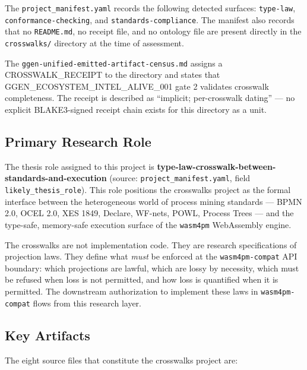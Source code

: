 The \texttt{project\_manifest.yaml} records the following detected surfaces: \texttt{type-law},
\texttt{conformance-checking}, and \texttt{standards-compliance}. The manifest also records that
no \texttt{README.md}, no receipt file, and no ontology file are present directly in the
\texttt{crosswalks/} directory at the time of assessment.

The \texttt{ggen-unified-emitted-artifact-census.md} assigns a \textsc{CROSSWALK\_RECEIPT} to
the directory and states that \textsc{GGEN\_ECOSYSTEM\_INTEL\_ALIVE\_001} gate 2 validates
crosswalk completeness. The receipt is described as ``implicit; per-crosswalk dating'' --- no
explicit \textsc{BLAKE3}-signed receipt chain exists for this directory as a unit.

\subsection{Primary Research Role}
\label{sec:crosswalks-identity-role}

The thesis role assigned to this project is \textbf{type-law-crosswalk-between-standards-and-execution}
(source: \texttt{project\_manifest.yaml}, field \texttt{likely\_thesis\_role}). This role
positions the crosswalks project as the formal interface between the heterogeneous world of
process mining standards --- \textsc{BPMN} 2.0, \textsc{OCEL} 2.0, \textsc{XES} 1849,
Declare, WF-nets, \textsc{POWL}, Process Trees --- and the type-safe, memory-safe execution
surface of the \texttt{wasm4pm} WebAssembly engine.

The crosswalks are not implementation code. They are research specifications of projection laws.
They define what \emph{must} be enforced at the \texttt{wasm4pm-compat} API boundary: which
projections are lawful, which are lossy by necessity, which must be refused when loss is not
permitted, and how loss is quantified when it is permitted. The downstream authorization to
implement these laws in \texttt{wasm4pm-compat} flows from this research layer.

\subsection{Key Artifacts}
\label{sec:crosswalks-identity-artifacts}

The eight source files that constitute the crosswalks project are:

